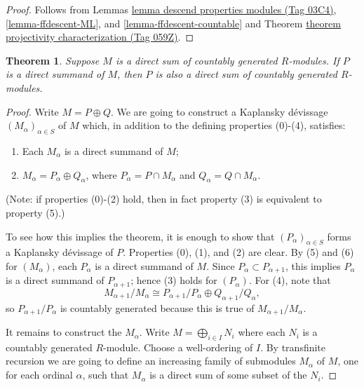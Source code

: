 \documentclass{amsart}
\theoremstyle{plain}
\newtheorem{theorem}[subsection]{Theorem}
\theoremstyle{definition}
\theoremstyle{remark}
\numberwithin{equation}{subsection}
\begin{document}
\begin{proof}
Follows from Lemmas \href{https://stacks.math.columbia.edu/tag/03C4}{lemma descend properties modules (Tag 03C4)},
\ref{lemma-ffdescent-ML}, and \ref{lemma-ffdescent-countable} and
Theorem \href{https://stacks.math.columbia.edu/tag/059Z}{theorem projectivity characterization (Tag 059Z)}.
\end{proof}


\begin{theorem}
\label{theorem-kaplansky-direct-sum}
Suppose $M$ is a direct sum of countably generated $R$-modules.  If $P$ is a
direct summand of $M$, then $P$ is also a direct sum of countably generated
$R$-modules.
\end{theorem}

\begin{proof}
Write $M = P \oplus Q$.  We are going to construct a Kaplansky d\'evissage
$(M_{\alpha})_{\alpha \in S}$ of $M$ which, in addition to the defining
properties (0)-(4), satisfies:
\begin{enumerate}
\item[(5)] Each $M_{\alpha}$ is a direct summand of $M$;
\item[(6)] $M_{\alpha} = P_{\alpha} \oplus Q_{\alpha}$, where $P_{\alpha} =P
\cap M_{\alpha}$ and $Q_\alpha = Q \cap M_{\alpha}$.
\end{enumerate}
(Note: if properties (0)-(2) hold, then in fact property (3) is equivalent to
property (5).)

\medskip\noindent
To see how this implies the theorem, it is enough to show that
$(P_{\alpha})_{\alpha \in S}$ forms a Kaplansky d\'evissage of $P$.  Properties
(0), (1), and (2) are clear.  By (5) and (6) for $(M_{\alpha})$, each
$P_{\alpha}$ is a direct summand of $M$.  Since $P_{\alpha} \subset P_{\alpha +
1}$, this implies $P_{\alpha}$ is a direct summand of $P_{\alpha + 1}$; hence
(3) holds for $(P_{\alpha})$.  For (4), note that
$$
M_{\alpha + 1}/M_{\alpha} \cong P_{\alpha + 1}/P_{\alpha} \oplus
Q_{\alpha + 1}/Q_{\alpha},
$$
so $P_{\alpha + 1}/P_{\alpha}$ is countably generated because this is true of
$M_{\alpha + 1}/M_{\alpha}$.

\medskip\noindent
It remains to construct the $M_{\alpha}$.  Write $M = \bigoplus_{i \in I} N_i$
where each $N_i$ is a countably generated $R$-module.  Choose a well-ordering
of $I$.  By transfinite recursion we are going to define an increasing family
of submodules $M_{\alpha}$ of $M$, one for each ordinal $\alpha$, such that
$M_{\alpha}$ is a direct sum of some subset of the $N_i$.


\end{proof}
\end{document}
